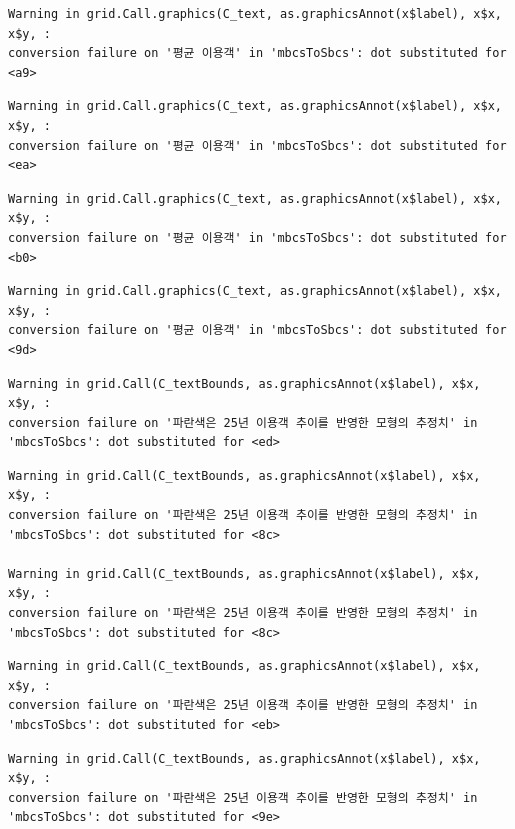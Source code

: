 \documentclass[
  letterpaper,
  DIV=11,
  numbers=noendperiod]{scrreprt}
\begin{document}
\begin{verbatim}
Warning in grid.Call.graphics(C_text, as.graphicsAnnot(x$label), x$x, x$y, :
conversion failure on '평균 이용객' in 'mbcsToSbcs': dot substituted for <a9>
\end{verbatim}

\begin{verbatim}
Warning in grid.Call.graphics(C_text, as.graphicsAnnot(x$label), x$x, x$y, :
conversion failure on '평균 이용객' in 'mbcsToSbcs': dot substituted for <ea>
\end{verbatim}

\begin{verbatim}
Warning in grid.Call.graphics(C_text, as.graphicsAnnot(x$label), x$x, x$y, :
conversion failure on '평균 이용객' in 'mbcsToSbcs': dot substituted for <b0>
\end{verbatim}

\begin{verbatim}
Warning in grid.Call.graphics(C_text, as.graphicsAnnot(x$label), x$x, x$y, :
conversion failure on '평균 이용객' in 'mbcsToSbcs': dot substituted for <9d>
\end{verbatim}

\begin{verbatim}
Warning in grid.Call(C_textBounds, as.graphicsAnnot(x$label), x$x, x$y, :
conversion failure on '파란색은 25년 이용객 추이를 반영한 모형의 추정치' in
'mbcsToSbcs': dot substituted for <ed>
\end{verbatim}

\begin{verbatim}
Warning in grid.Call(C_textBounds, as.graphicsAnnot(x$label), x$x, x$y, :
conversion failure on '파란색은 25년 이용객 추이를 반영한 모형의 추정치' in
'mbcsToSbcs': dot substituted for <8c>

Warning in grid.Call(C_textBounds, as.graphicsAnnot(x$label), x$x, x$y, :
conversion failure on '파란색은 25년 이용객 추이를 반영한 모형의 추정치' in
'mbcsToSbcs': dot substituted for <8c>
\end{verbatim}

\begin{verbatim}
Warning in grid.Call(C_textBounds, as.graphicsAnnot(x$label), x$x, x$y, :
conversion failure on '파란색은 25년 이용객 추이를 반영한 모형의 추정치' in
'mbcsToSbcs': dot substituted for <eb>
\end{verbatim}

\begin{verbatim}
Warning in grid.Call(C_textBounds, as.graphicsAnnot(x$label), x$x, x$y, :
conversion failure on '파란색은 25년 이용객 추이를 반영한 모형의 추정치' in
'mbcsToSbcs': dot substituted for <9e>
\end{verbatim}
\end{document}
